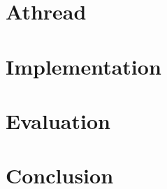 \documentclass{sig-alternate}
\begin{document}
\section{Athread}\label{sec:athread}

\section{Implementation}\label{sec:implementation}

\section{Evaluation}\label{sec:evaluation}

\section{Conclusion}\label{sec:conclusion}


 
\end{document}
